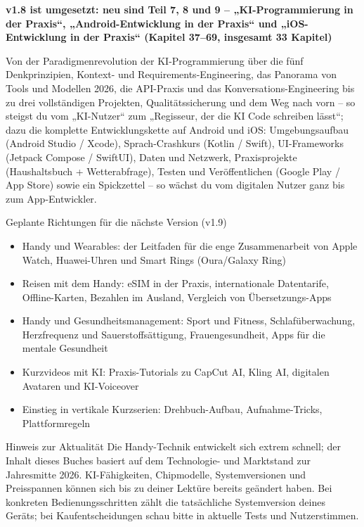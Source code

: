 

\textbf{v1.8 ist umgesetzt: neu sind Teil 7, 8 und 9 – „KI-Programmierung in der Praxis“, „Android-Entwicklung in der Praxis“ und „iOS-Entwicklung in der Praxis“ (Kapitel 37–69, insgesamt 33 Kapitel)}\par

Von der Paradigmenrevolution der KI-Programmierung über die fünf Denkprinzipien, Kontext- und Requirements-Engineering, das Panorama von Tools und Modellen 2026, die API-Praxis und das Konversations-Engineering bis zu drei vollständigen Projekten, Qualitätssicherung und dem Weg nach vorn – so steigst du vom „KI-Nutzer“ zum „Regisseur, der die KI Code schreiben lässt“; dazu die komplette Entwicklungskette auf Android und iOS: Umgebungsaufbau (Android Studio / Xcode), Sprach-Crashkurs (Kotlin / Swift), UI-Frameworks (Jetpack Compose / SwiftUI), Daten und Netzwerk, Praxisprojekte (Haushaltsbuch + Wetterabfrage), Testen und Veröffentlichen (Google Play / App Store) sowie ein Spickzettel – so wächst du vom digitalen Nutzer ganz bis zum App-Entwickler.

\begin{tcbinfo}{Geplante Richtungen für die nächste Version (v1.9)}
\begin{itemize}
  \item Handy und Wearables: der Leitfaden für die enge Zusammenarbeit von Apple Watch, Huawei-Uhren und Smart Rings (Oura/Galaxy Ring)
  \item Reisen mit dem Handy: eSIM in der Praxis, internationale Datentarife, Offline-Karten, Bezahlen im Ausland, Vergleich von Übersetzungs-Apps
  \item Handy und Gesundheitsmanagement: Sport und Fitness, Schlafüberwachung, Herzfrequenz und Sauerstoffsättigung, Frauengesundheit, Apps für die mentale Gesundheit
  \item Kurzvideos mit KI: Praxis-Tutorials zu CapCut AI, Kling AI, digitalen Avataren und KI-Voiceover
  \item Einstieg in vertikale Kurzserien: Drehbuch-Aufbau, Aufnahme-Tricks, Plattformregeln
\end{itemize}

\end{tcbinfo}

\begin{tcbwarn}{Hinweis zur Aktualität}
Die Handy-Technik entwickelt sich extrem schnell; der Inhalt dieses Buches basiert auf dem Technologie- und Marktstand zur Jahresmitte 2026. KI-Fähigkeiten, Chipmodelle, Systemversionen und Preisspannen können sich bis zu deiner Lektüre bereits geändert haben. Bei konkreten Bedienungsschritten zählt die tatsächliche Systemversion deines Geräts; bei Kaufentscheidungen schau bitte in aktuelle Tests und Nutzerstimmen.

\end{tcbwarn}
